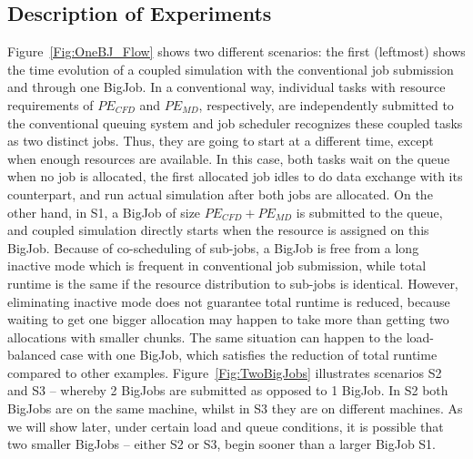 \documentclass[conference,final]{IEEEtran}
\begin{document}

\subsection{Description of Experiments}

Figure~\ref{Fig:OneBJ_Flow} shows two different scenarios: the first
(leftmost) shows the time evolution of a coupled simulation with the
conventional job submission and through one BigJob. In a conventional
way, individual tasks with resource requirements of $PE_{CFD}$ and
$PE_{MD}$, respectively, are independently submitted to the
conventional queuing system and job scheduler recognizes these coupled
tasks as two distinct jobs. Thus, they are going to start at a
different time, except when enough resources are available. In this
case, both tasks wait on the queue when no job is allocated, the first
allocated job idles to do data exchange with its counterpart, and run
actual simulation after both jobs are allocated. On the other hand, in
S1, a BigJob of size $PE_{CFD}+PE_{MD}$ is submitted to the queue, and
coupled simulation directly starts when the resource is assigned on
this BigJob. Because of co-scheduling of sub-jobs, a BigJob is free
from a long inactive mode which is frequent in conventional job
submission, while total runtime is the same if the resource
distribution to sub-jobs is identical. However, eliminating inactive
mode does not guarantee total runtime is reduced, because waiting to
get one bigger allocation may happen to take more than getting two
allocations with smaller chunks. The same situation can happen to the
load-balanced case with one BigJob, which satisfies the reduction of
total runtime compared to other examples.  Figure~\ref{Fig:TwoBigJobs}
illustrates scenarios S2 and S3 -- whereby 2 BigJobs are submitted as
opposed to 1 BigJob. In S2 both BigJobs are on the same machine,
whilst in S3 they are on different machines.  As we will show later,
under certain load and queue conditions, it is possible that two
smaller BigJobs -- either S2 or S3, begin sooner than a larger BigJob
S1.
\end{document}
